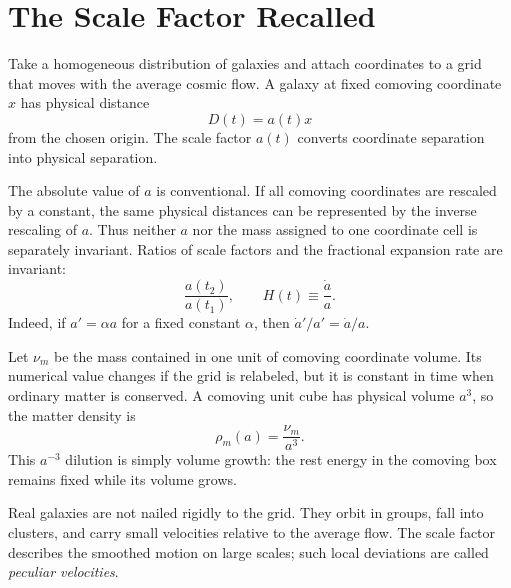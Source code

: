 \section{The Scale Factor Recalled}

Take a homogeneous distribution of galaxies and attach coordinates to a grid that moves with the average cosmic flow. A galaxy at fixed comoving coordinate \(x\) has physical distance
\begin{equation}
D(t)=a(t)x
\label{eq:c02-distance}
\end{equation}
from the chosen origin. The scale factor \(a(t)\) converts coordinate separation into physical separation.

The absolute value of \(a\) is conventional. If all comoving coordinates are rescaled by a constant, the same physical distances can be represented by the inverse rescaling of \(a\). Thus neither \(a\) nor the mass assigned to one coordinate cell is separately invariant. Ratios of scale factors and the fractional expansion rate are invariant:
\begin{equation}
\frac{a(t_2)}{a(t_1)},
\qquad
H(t)\equiv\frac{\dot a}{a}.
\label{eq:c02-hubble}
\end{equation}
Indeed, if \(a'=\alpha a\) for a fixed constant \(\alpha\), then \(\dot a'/a'=\dot a/a\).

Let \(\nu_m\) be the mass contained in one unit of comoving coordinate volume. Its numerical value changes if the grid is relabeled, but it is constant in time when ordinary matter is conserved. A comoving unit cube has physical volume \(a^3\), so the matter density is
\begin{equation}
\boxed{\rho_m(a)=\frac{\nu_m}{a^3}.}
\label{eq:c02-matter-density}
\end{equation}
This \(a^{-3}\) dilution is simply volume growth: the rest energy in the comoving box remains fixed while its volume grows.

Real galaxies are not nailed rigidly to the grid. They orbit in groups, fall into clusters, and carry small velocities relative to the average flow. The scale factor describes the smoothed motion on large scales; such local deviations are called \emph{peculiar velocities}.

\begin{classroomqa}
\end{classroomqa}

